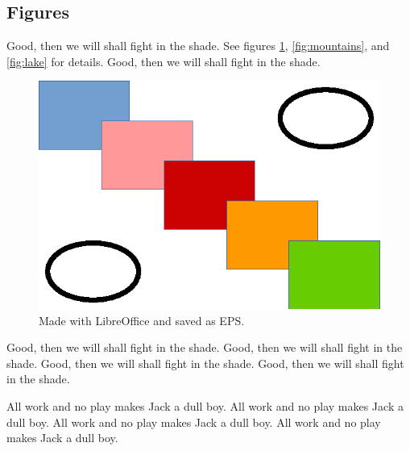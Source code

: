 
%
%

%
%

\subsection{Figures}
\label{sec:discussion_figures}

Good, then we will shall fight in the shade.
See figures
\ref{fig:shapes},
\ref{fig:mountains}, and
\ref{fig:lake} for details.
Good, then we will shall fight in the shade.

\begin{figure}[ht]
\centering
\includegraphics{../figures/shapes.eps}
\caption{Made with LibreOffice and saved as EPS.}
\label{fig:shapes}
\end{figure}

Good, then we will shall fight in the shade.
Good, then we will shall fight in the shade.
Good, then we will shall fight in the shade.
Good, then we will shall fight in the shade.

All work and no play makes Jack a dull boy.
All work and no play makes Jack a dull boy.
All work and no play makes Jack a dull boy.
All work and no play makes Jack a dull boy.

